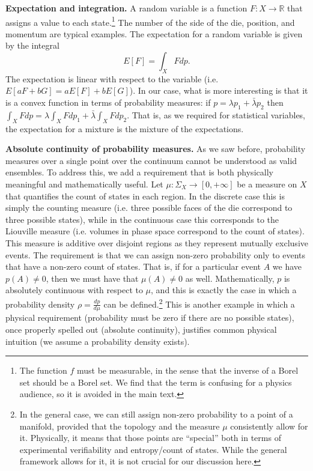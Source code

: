 \documentclass[10pt,twocolumn, nofootinbib]{revtex4-2}
\begin{document}
\textbf{Expectation and integration.} A random variable is a function $F : X \to \mathbb{R}$ that assigns a value to each state.\footnote{The function $f$ must be measurable, in the sense that the inverse of a Borel set should be a Borel set. We find that the term is confusing for a physics audience, so it is avoided in the main text.} The number of the side of the die, position, and momentum are typical examples. The expectation for a random variable is given by the integral
\begin{equation}
	E[F] = \int_X F dp.
\end{equation}
The expectation is linear with respect to the variable (i.e. $E[aF+bG]= aE[F]+bE[G]$). In our case, what is more interesting is that it is a convex function in terms of probability measures: if $p = \lambda p_1 + \bar{\lambda} p_2$ then $\int_X F dp = \lambda \int_X F dp_1 + \bar{\lambda} \int_X F dp_2$. That is, as we required for statistical variables, the expectation for a mixture is the mixture of the expectations.

\textbf{Absolute continuity of probability measures.} As we saw before, probability measures over a single point over the continuum cannot be understood as valid ensembles. To address this, we add a requirement that is both physically meaningful and mathematically useful. Let $\mu : \Sigma_X \to [0, + \infty]$ be a measure on $X$ that quantifies the count of states in each region. In the discrete case this is simply the counting measure (i.e. three possible faces of the die correspond to three possible states), while in the continuous case this corresponds to the Liouville measure (i.e. volumes in phase space correspond to the count of states). This measure is additive over disjoint regions as they represent mutually exclusive events. The requirement is that we can assign non-zero probability only to events that have a non-zero count of states. That is, if for a particular event $A$ we have $p(A) \neq 0$, then we must have that $\mu(A) \neq 0$ as well. Mathematically, $p$ is absolutely continuous with respect to $\mu$, and this is exactly the case in which a probability density $\rho = \frac{dp}{d\mu}$ can be defined.\footnote{In the general case, we can still assign non-zero probability to a point of a manifold, provided that the topology and the measure $\mu$ consistently allow for it. Physically, it means that those points are ``special'' both in terms of experimental verifiability and entropy/count of states. While the general framework allows for it, it is not crucial for our discussion here.} This is another example in which a physical requirement (probability must be zero if there are no possible states), once properly spelled out (absolute continuity), justifies common physical intuition (we assume a probability density exists).
\end{document}
